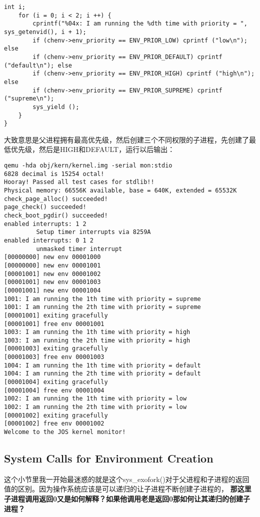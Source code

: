 \documentclass{article}
\newcommand{\highlight}[1]{{\bfseries \color{red}  #1}}
\newcommand{\funcname}[1]{{\ttfamily \small #1}}
\begin{document}
\begin{CJK*}{UTF8}{gkai}
\begin{lstlisting}[style=ccode, title={\scriptsize \ttfamily \bfseries user/priorsched.c}]
    int i;
    for (i = 0; i < 2; i ++) {
        cprintf("%04x: I am running the %dth time with priority = ", sys_getenvid(), i + 1);
        if (chenv->env_priority == ENV_PRIOR_LOW) cprintf ("low\n"); else
        if (chenv->env_priority == ENV_PRIOR_DEFAULT) cprintf ("default\n"); else
        if (chenv->env_priority == ENV_PRIOR_HIGH) cprintf ("high\n"); else
        if (chenv->env_priority == ENV_PRIOR_SUPREME) cprintf ("supreme\n"); 
        sys_yield ();
    }
}
\end{lstlisting}

大致意思是父进程拥有最高优先级，然后创建三个不同权限的子进程，先创建了最低优先级，然后是HIGH和DEFAULT，运行以后输出：


\begin{lstlisting}[style=console]
qemu -hda obj/kern/kernel.img -serial mon:stdio
6828 decimal is 15254 octal!
Hooray! Passed all test cases for stdlib!!
Physical memory: 66556K available, base = 640K, extended = 65532K
check_page_alloc() succeeded!
page_check() succeeded!
check_boot_pgdir() succeeded!
enabled interrupts: 1 2
	     Setup timer interrupts via 8259A
enabled interrupts: 0 1 2
	     unmasked timer interrupt
[00000000] new env 00001000
[00000000] new env 00001001
[00001001] new env 00001002
[00001001] new env 00001003
[00001001] new env 00001004
1001: I am running the 1th time with priority = supreme
1001: I am running the 2th time with priority = supreme
[00001001] exiting gracefully
[00001001] free env 00001001
1003: I am running the 1th time with priority = high
1003: I am running the 2th time with priority = high
[00001003] exiting gracefully
[00001003] free env 00001003
1004: I am running the 1th time with priority = default
1004: I am running the 2th time with priority = default
[00001004] exiting gracefully
[00001004] free env 00001004
1002: I am running the 1th time with priority = low
1002: I am running the 2th time with priority = low
[00001002] exiting gracefully
[00001002] free env 00001002
Welcome to the JOS kernel monitor!
\end{lstlisting}


\subsection{System Calls for Environment Creation}

这个小节里我一开始最迷惑的就是这个\funcname{sys\_exofork()}对于父进程和子进程的返回值的区别。因为操作系统应该是可以递归的让子进程不断创建子进程的，\highlight{那这里子进程调用返回0又是如何解释？如果他调用老是返回0那如何让其递归的创建子进程？}


\end{CJK*}
\end{document}
